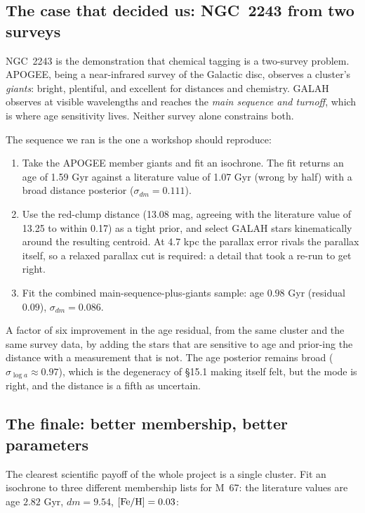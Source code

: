 \subsection{The case that decided us: NGC~2243 from two surveys}

NGC~2243 is the demonstration that chemical tagging is a two-survey problem.
APOGEE, being a near-infrared survey of the Galactic disc, observes a
cluster's \emph{giants}: bright, plentiful, and excellent for distances and
chemistry. GALAH observes at visible wavelengths and reaches the
\emph{main sequence and turnoff}, which is where age sensitivity lives. Neither
survey alone constrains both.

The sequence we ran is the one a workshop should reproduce:

\begin{enumerate}
\item Take the APOGEE member giants and fit an isochrone. The fit returns an
age of 1.59 Gyr against a literature value of 1.07 Gyr (wrong by half) with a
broad distance posterior ($\sigma_{dm} = 0.111$).
\item Use the red-clump distance (13.08 mag, agreeing with the literature value
of 13.25 to within 0.17) as a tight prior, and select GALAH stars kinematically
around the resulting centroid. At 4.7 kpc the parallax error rivals the
parallax itself, so a relaxed parallax cut is required: a detail that took a
re-run to get right.
\item Fit the combined main-sequence-plus-giants sample: age $0.98$ Gyr
  (residual $0.09$), $\sigma_{dm} = 0.086$.
\end{enumerate}

A factor of six improvement in the age residual, from the same cluster and the
same survey data, by adding the stars that are sensitive to age and prior-ing
the distance with a measurement that is not. The age posterior remains broad
($\sigma_{\log a} \approx 0.97$), which is the degeneracy of \S 15.1 making
itself felt, but the mode is right, and the distance is a fifth as uncertain.

\subsection{The finale: better membership, better parameters}

The clearest scientific payoff of the whole project is a single cluster. Fit an
isochrone to three different membership lists for M~67: the literature values
are age $2.82$ Gyr, $dm = 9.54$, $[{\rm Fe/H}] = 0.03$:

